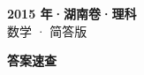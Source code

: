 \documentclass[zihao=-4, a4paper]{ctexart}
\begin{document}
\begin{center}
  {\Large\bfseries 2015 年·湖南卷·理科}\\[4pt]
  {\large 数学 · 简答版}
\end{center}
\medskip
{}

\clearpage
{}
\begin{center}{\Large\bfseries 答案速查}\end{center}
\medskip

\end{document}
